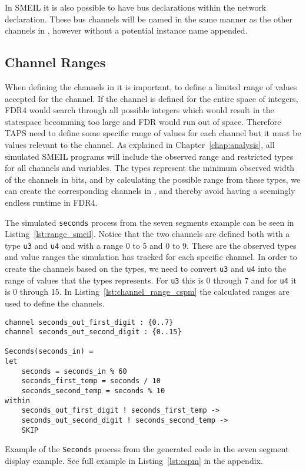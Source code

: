 In SMEIL it is also possible to have bus declarations within the network declaration. These bus channels will be named in the same manner as the other channels in \cspm{}, however without a potential instance name appended.

\subsection{\cspm{} Channel Ranges}
When defining the channels in \cspm{} it is important, to define a limited range of values accepted for the channel. If the channel is defined for the entire space of integers, FDR4 would search through all possible integers which would result in the statespace becomming too large and FDR would run out of space. Therefore TAPS need to define some specific range of values for each channel but it must be values relevant to the channel.
As explained in Chapter~\ref{chap:analysis}, all simulated SMEIL programs will include the observed range and restricted types for all channels and variables. The types represent the minimum observed width of the channels in bits, and by calculating the possible range from these types, we can create the corresponding channels in \cspm{}, and thereby avoid having a seemingly endless runtime in FDR4.

The simulated \texttt{seconds} process from the seven segments example can be seen in Listing~\ref{lst:range_smeil}. Notice that the two channels are defined both with a type \texttt{u3} and \texttt{u4} and with a range 0 to 5 and 0 to 9. These are the observed types and value ranges the simulation has tracked for each specific channel. In order to create the \cspm{} channels based on the types, we need to convert \texttt{u3} and \texttt{u4} into the range of values that the types represents. For \texttt{u3} this is 0 through 7 and for \texttt{u4} it is 0 through 15. In Listing~\ref{lst:channel_range_cspm} the calculated ranges are used to define the \cspm{} channels.

\begin{listing}
\begin{verbatim}
channel seconds_out_first_digit : {0..7}
channel seconds_out_second_digit : {0..15}

Seconds(seconds_in) =
let
    seconds = seconds_in % 60
    seconds_first_temp = seconds / 10
    seconds_second_temp = seconds % 10
within
    seconds_out_first_digit ! seconds_first_temp ->
    seconds_out_second_digit ! seconds_second_temp ->
    SKIP
\end{verbatim}
\caption{Example of the \texttt{Seconds} process from the generated \cspm{} code in the seven segment display example. See full example in Listing~\ref{lst:cspm} in the appendix.}
\label{lst:channel_range_cspm}
\end{listing}


